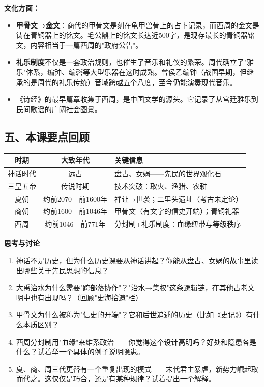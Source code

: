 \documentclass[a4paper,12pt]{ctexart}
\begin{document}
\textbf{文化方面：}
\begin{itemize}
  \item \textbf{甲骨文→金文}：商代的甲骨文是刻在龟甲兽骨上的占卜记录，而西周的金文是铸在青铜器上的铭文。毛公鼎上的铭文长达近500字，是现存最长的青铜器铭文，内容相当于一篇西周的"政府公告"。
  \item \textbf{礼乐制度}不仅是一套政治规则，也催生了音乐和礼仪的繁荣。周代确立了"雅乐"体系，编钟、编磬等大型乐器在这时成熟。曾侯乙编钟（战国早期，但继承的是周代的礼乐传统）音域跨越五个八度，至今仍能演奏现代音乐。
  \item 《诗经》的最早篇章收集于西周，是中国文学的源头。它记录了从宫廷雅乐到民间歌谣的广阔社会图景。
\end{itemize}

\subsection*{五、本课要点回顾}

\begin{center}
\begin{tabular}{|c|c|p{8cm}|}
\hline
\textbf{时期} & \textbf{大致年代} & \textbf{关键信息} \\
\hline
神话时代 & 远古 & 盘古、女娲——先民的世界观化石 \\
\hline
三皇五帝 & 传说时期 & 技术突破：取火、渔猎、农耕 \\
\hline
夏朝 & 约前2070—前1600年 & 禅让→世袭；二里头遗址（考古未定论） \\
\hline
商朝 & 约前1600—前1046年 & 甲骨文（有文字的信史开端）；青铜礼器 \\
\hline
西周 & 约前1046—前771年 & 分封制+礼乐制度：血缘纽带与等级秩序 \\
\hline
\end{tabular}
\end{center}

{\large\textcolor{orange!80!black}{\textbf{思考与讨论}}}
\begin{enumerate}
  \item 神话不是历史，但为什么历史课要从神话讲起？你能从盘古、女娲的故事里读出哪些关于先民思想的信息？
  \item 大禹治水为什么需要"跨部落协作"？"治水→集权"这条逻辑链，在其他古老文明中也有出现吗？（回顾"史海拾遗"栏）
  \item 甲骨文为什么被称为"信史的开端"？它和后世追述的历史（比如《史记》）有什么本质区别？
  \item 西周分封制用"血缘"来维系政治——你觉得这个设计高明吗？好处和隐患各是什么？试着举一个具体的例子说明隐患。
  \item 夏、商、周三代更替有一个重复出现的模式——末代君主暴虐，新势力崛起取而代之。这仅仅是巧合，还是有某种规律？试着提出一个解释。
\end{enumerate}
\end{document}
